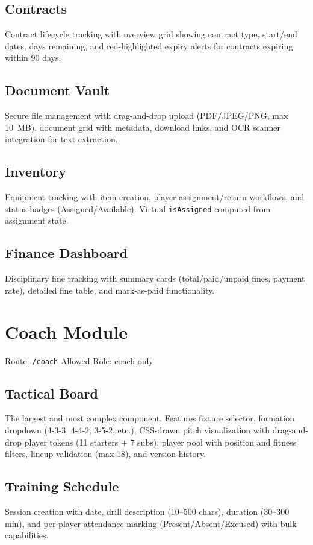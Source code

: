 \documentclass[12pt,a4paper,oneside]{report}
\begin{document}
\subsection{Contracts}
Contract lifecycle tracking with overview grid showing contract type, start/end dates, days remaining, and red-highlighted expiry alerts for contracts expiring within 90 days.

\subsection{Document Vault}
Secure file management with drag-and-drop upload (PDF/JPEG/PNG, max 10~MB), document grid with metadata, download links, and OCR scanner integration for text extraction.

\subsection{Inventory}
Equipment tracking with item creation, player assignment/return workflows, and status badges (Assigned/Available). Virtual \texttt{isAssigned} computed from assignment state.

\subsection{Finance Dashboard}
Disciplinary fine tracking with summary cards (total/paid/unpaid fines, payment rate), detailed fine table, and mark-as-paid functionality.

\section{Coach Module}

Route: \texttt{/coach} \quad Allowed Role: coach only

\subsection{Tactical Board}
The largest and most complex component. Features fixture selector, formation dropdown (4-3-3, 4-4-2, 3-5-2, etc.), CSS-drawn pitch visualization with drag-and-drop player tokens (11 starters + 7 subs), player pool with position and fitness filters, lineup validation (max 18), and version history.

\subsection{Training Schedule}
Session creation with date, drill description (10--500 chars), duration (30--300 min), and per-player attendance marking (Present/Absent/Excused) with bulk capabilities.
\end{document}

